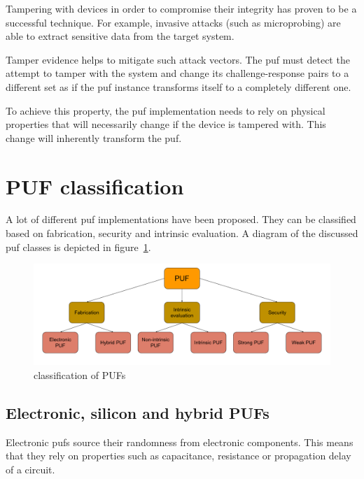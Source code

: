 Tampering with devices in order to compromise their integrity has proven to be a successful technique. For example, invasive attacks (such as microprobing) are able to extract sensitive data from the target system.\cite{Kommerling1999}

Tamper evidence helps to mitigate such attack vectors. The \gls{puf} must detect the attempt to tamper with the system and change its challenge-response pairs to a different set as if the \gls{puf} instance transforms itself to a completely different one.

To achieve this property, the \gls{puf} implementation needs to rely on physical properties that will necessarily change if the device is tampered with. This change will inherently transform the \gls{puf}.

\section{PUF classification}

A lot of different \gls{puf} implementations have been proposed. They can be classified based on fabrication, security and intrinsic evaluation\cite{Shital2017}\cite{McGrath2019}. A diagram of the discussed \gls{puf} classes is depicted in figure~\ref{fig:classification}.

\begin{figure}[ht!]
    \centering
    \captionsetup{justification=centering,margin=0.5cm}
    \includegraphics[width=\textwidth]{images/classification}
    \caption{classification of PUFs}
    \label{fig:classification}
\end{figure}

\subsection{Electronic, silicon and hybrid PUFs}

Electronic \glspl{puf} source their randomness from electronic components. This means that they rely on properties such as capacitance, resistance or propagation delay of a circuit.

